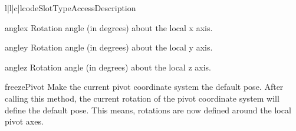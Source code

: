 \begin{tableiv}{l|l|c|l}{code}{Slot}{Type}{Access}{Description}
\end{tableiv}

\begin{memberdesc}{anglex}
Rotation angle (in degrees) about the local x axis.
\end{memberdesc}

\begin{memberdesc}{angley}
Rotation angle (in degrees) about the local y axis.
\end{memberdesc}

\begin{memberdesc}{anglez}
Rotation angle (in degrees) about the local z axis.
\end{memberdesc}

\begin{methoddesc}{freezePivot}{}
Make the current pivot coordinate system the default pose. After
calling this method, the current rotation of the pivot coordinate
system will define the default pose. This means, rotations are now
defined around the local pivot axes. 
\end{methoddesc}






